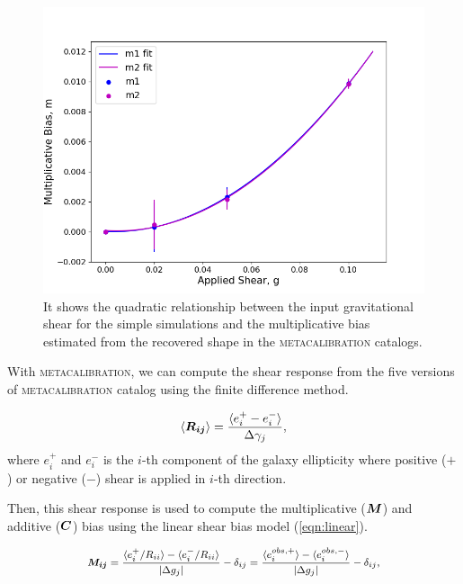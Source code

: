 \documentclass[fleqn,usenatbib]{mnras}
\begin{document}
\begin{figure}
	\includegraphics[width=\columnwidth]{metacal_bias_shear.png}
    \vspace*{-5mm}
    \caption{It shows the quadratic relationship between the input gravitational shear for the simple simulations and the multiplicative bias estimated from the recovered shape in the \textsc{metacalibration} catalogs. }
    \label{fig:metacal_shear_linear}
\end{figure}


With \textsc{metacalibration}, we can compute the shear response from the five versions of \textsc{metacalibration} catalog using the finite difference method. 


\begin{equation}
    \langle\vb*{R_{ij}}\rangle = 
    \frac{\langle e^{+}_{i} - e^{-}_{i} \rangle}{\Delta\gamma_{j}}, 
\end{equation}
where $e^{+}_{i}$ and $e^{-}_{i}$ is the $i$-th component of the galaxy ellipticity where positive ($+$) or negative ($-$) shear is applied in $i$-th direction. 


Then, this shear response is used to compute the multiplicative ($\vb*{M}$) and additive ($\vb*{C}$) bias using the linear shear bias model (\ref{eqn:linear}). 


\begin{equation}
    \small
    \vb*{M_{ij}} = 
    \frac{\langle e^{+}_{i}/R_{ii} \rangle - \langle e^{-}_{i}/R_{ii} \rangle}{\abs{\Delta g_{j}}} - \delta_{ij} 
    = \frac{\langle e^{obs,+}_{i}\rangle - \langle e^{obs,-}_{i}\rangle}{\abs{\Delta g_{j}}} - \delta_{ij}, 
\end{equation}
\end{document}
